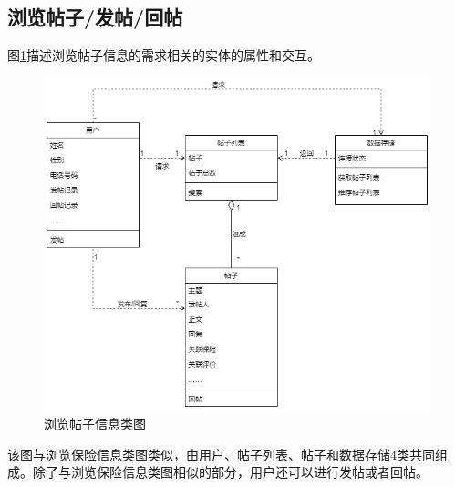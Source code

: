 \documentclass[a4paper]{ctexart}
\begin{document}
\subsection{浏览帖子/发帖/回帖}
图\ref{fig:浏览帖子信息类图}描述浏览帖子信息的需求相关的实体的属性和交互。
\begin{figure}[H]
\centering
\includegraphics[scale=0.4]{image/2_5类图.png}
\caption{浏览帖子信息类图}
\label{fig:浏览帖子信息类图}
\end{figure}
该图与浏览保险信息类图类似，由用户、帖子列表、帖子和数据存储4类共同组成。除了与浏览保险信息类图相似的部分，用户还可以进行发帖或者回帖。\\
\end{document}
